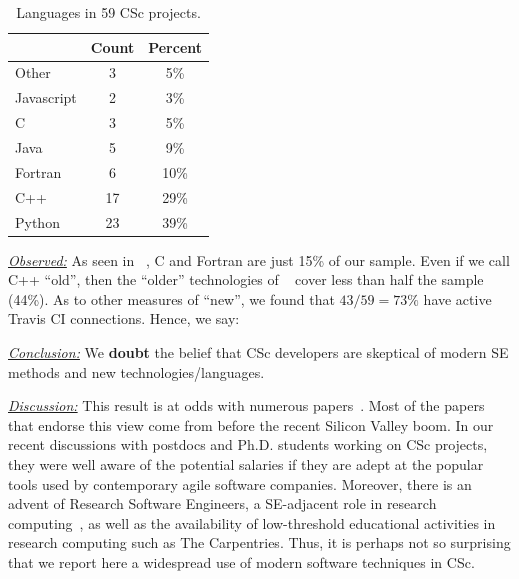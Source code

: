 \documentclass[conference,10pt]{IEEEtran}
\newenvironment{RQ}{\vspace{1mm}\begin{tcolorbox}[enhanced,width=3.4in,size=fbox,colback=red!5!white,drop shadow southeast,sharp corners]}{\end{tcolorbox}}
\begin{document}
\begin{table}
\vspace{-10pt}
\caption{Languages in 59 CSc projects.  
}\label{tbl:language}
\vspace{-12pt}
 \footnotesize
 \hspace{-3pt}\begin{tabular}{l|c|c}
 \multicolumn{1}{c|}{} & \multicolumn{1}{c|}{Count} & \multicolumn{1}{c}{Percent}\\
\hline
Other & 3 &  5\%  \\ 
Javascript	& 2 & 3\% \\ 
C &	3 & 5\% \\ 
Java	& 5 & 9\% \\ 
Fortran	& 6 & 10\% \\
C++	& 17 & 29\% \\
Python & 23 & 39\% 
\end{tabular}
\vspace{-10pt}
\end{table} \noindent\textit{\underline{Observed:}} 
As seen in ~, C and Fortran are just 15\% of our sample.
Even if we call C++ ``old'', then the ``older'' technologies of ~
cover less than half the sample (44\%).
As to other measures of ``new'', we found that  $43/59=73\%$
have active
Travis CI connections.  Hence, we say:

\begin{RQ} 
\textit{\underline{Conclusion:}} We \textbf{doubt} the belief that 
CSc developers are skeptical of modern SE methods and new technologies/languages.
\end{RQ}

\noindent \textit{\underline{Discussion:}} This result is at odds
with numerous papers~\cite{basili08_hpc, carver07_environment, Prabhu11_cssurvey, kendall05_C, ragan14_pythoncs}. 
Most of the papers that endorse this view come from before the recent Silicon Valley boom. In our recent discussions with postdocs and Ph.D. students working on CSc projects,
they were well aware of the potential salaries if they are adept at the popular tools used by contemporary agile software companies. Moreover, there is an advent of Research Software Engineers, a SE-adjacent role in research computing~\cite{RSEs_roles}, as well as the availability of low-threshold educational activities in
research computing such as The Carpentries. Thus, it is perhaps not so surprising that we report here a widespread use of modern software techniques in CSc. \\
 
\end{document}
